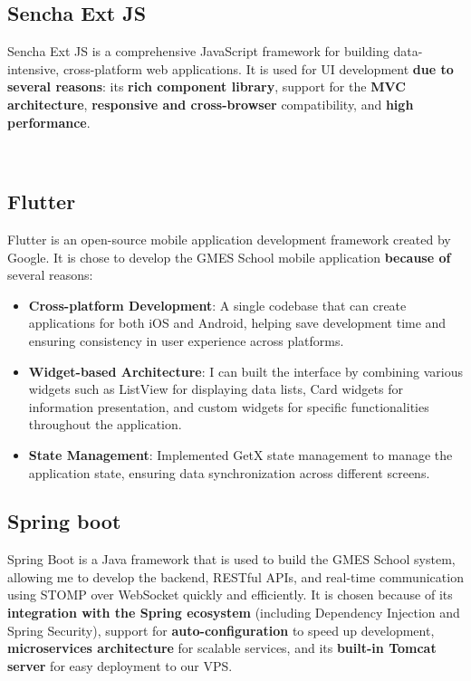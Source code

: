 \subsection{Sencha Ext JS}
\begin{minipage}{\textwidth}
    \setlength{\parindent}{2em}
    Sencha Ext JS is a comprehensive JavaScript framework for building data-intensive, cross-platform web applications. It is used for UI development \textbf{due to several reasons}: its \textbf{rich component library}, support for the \textbf{MVC architecture}, \textbf{responsive and cross-browser} compatibility, and \textbf{high performance}.
\end{minipage}\\

\subsection{Flutter}
\begin{minipage}{\textwidth}
    \setlength{\parindent}{2em}
    Flutter is an open-source mobile application development framework created by Google. It is chose to develop the GMES School mobile application \textbf{because of} several reasons:
\end{minipage}
\begin{itemize}
\setlength{\itemsep}{0.0em}
    \item \textbf{Cross-platform Development}: A single codebase that can create applications for both iOS and Android, helping save development time and ensuring consistency in user experience across platforms.
    \item \textbf{Widget-based Architecture}: I can built the interface by combining various widgets such as ListView for displaying data lists, Card widgets for information presentation, and custom widgets for specific functionalities throughout the application.
    \item \textbf{State Management}: Implemented GetX state management to manage the application state, ensuring data synchronization across different screens.
\end{itemize}

\subsection{Spring boot}
\begin{minipage}{\textwidth}
    \setlength{\parindent}{2em}
    Spring Boot is a Java framework that is used to build the GMES School system, allowing me to develop the backend, RESTful APIs, and real-time communication using STOMP over WebSocket quickly and efficiently. It is chosen because of its \textbf{integration with the Spring ecosystem} (including Dependency Injection and Spring Security), support for \textbf{auto-configuration} to speed up development, \textbf{microservices architecture} for scalable services, and its \textbf{built-in Tomcat server} for easy deployment to our VPS.
\end{minipage}\\

